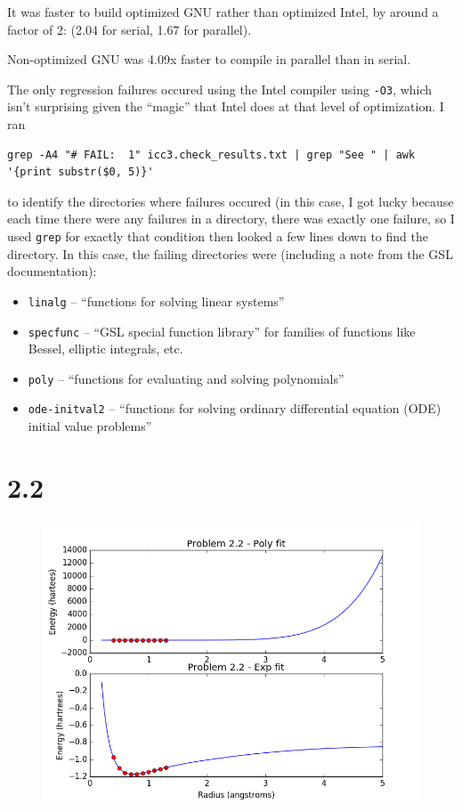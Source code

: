 \documentclass{article}
\begin{document}
It was faster to build optimized GNU rather than optimized Intel, by around a factor of 2: (2.04 for serial, 1.67 for parallel).

Non-optimized GNU was 4.09x faster to compile in parallel than in serial.

The only regression failures occured using the Intel compiler using \texttt{-O3}, which isn't surprising given
the ``magic'' that Intel does at that level of optimization. 
I ran
\begin{verbatim}
grep -A4 "# FAIL:  1" icc3.check_results.txt | grep "See " | awk '{print substr($0, 5)}'
\end{verbatim}
to identify the directories where failures occured (in this case, I got lucky because each time there were any failures in
a directory, there was exactly one failure, so I used \texttt{grep} for exactly that condition then looked a few lines down to find the directory. In this case, the failing directories were (including a note from the GSL documentation):
\begin{itemize}
\item \texttt{linalg} -- ``functions for solving linear systems''
\item \texttt{specfunc} -- ``GSL special function library'' for families of functions like Bessel, elliptic integrals, etc.
\item \texttt{poly} -- ``functions for evaluating and solving polynomials''
\item \texttt{ode-initval2} -- ``functions for solving ordinary differential equation (ODE) initial value problems''
\end{itemize}


\section{2.2}
\begin{figure}[h]
\begin{center}
\includegraphics[scale=0.75]{ex2.2/2_2.png}
\end{center}
\end{figure}

%
%
\end{document}
